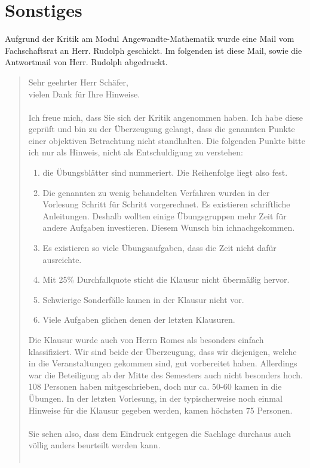 \documentclass[a4paper, 11pt]{article} %
\begin{document}
\section{Sonstiges}
Aufgrund der Kritik am Modul Angewandte-Mathematik wurde eine Mail vom Fachschaftsrat an Herr. Rudolph geschickt. Im folgenden ist diese Mail, sowie die Antwortmail von Herr. Rudolph abgedruckt.
\begin{quote}
Sehr geehrter Herr Schäfer, \\
vielen Dank für Ihre Hinweise. \\
\\
Ich freue mich, dass Sie sich der Kritik angenommen haben.  Ich habe diese geprüft und bin zu der Überzeugung gelangt, dass die genannten  Punkte einer objektiven Betrachtung nicht standhalten. Die folgenden Punkte bitte ich nur als Hinweis, nicht als Entschuldigung zu verstehen:
\begin{enumerate}
\item die Übungsblätter sind nummeriert. Die Reihenfolge liegt also fest.
\item Die genannten zu wenig behandelten Verfahren wurden in der Vorlesung Schritt für Schritt vorgerechnet. Es existieren schriftliche Anleitungen. Deshalb wollten einige Übungsgruppen mehr Zeit für andere Aufgaben investieren. Diesem Wunsch bin ichnachgekommen.
\item Es existieren so viele Übungsaufgaben, dass die Zeit nicht dafür ausreichte.
\item Mit 25\% Durchfallquote sticht die Klausur nicht übermäßig hervor.
\item Schwierige Sonderfälle kamen in der Klausur nicht vor. 
\item Viele Aufgaben glichen denen der letzten Klausuren.
\end{enumerate}
Die Klausur wurde auch von Herrn Romes als besonders einfach klassifiziert. Wir sind beide der Überzeugung, dass wir diejenigen, welche in die Veranstaltungen gekommen sind, gut vorbereitet haben. Allerdings war die Beteiligung ab der Mitte des Semesters auch nicht besonders hoch. 108 Personen haben mitgeschrieben, doch nur ca. 50-60 kamen in die Übungen. In der letzten Vorlesung, in der typischerweise noch einmal Hinweise für die Klausur gegeben werden, kamen höchsten 75 Personen. \\
\\
Sie sehen also, dass dem Eindruck entgegen die Sachlage durchaus auch  völlig anders beurteilt werden kann.\\
\\

\end{quote}
\end{document}
